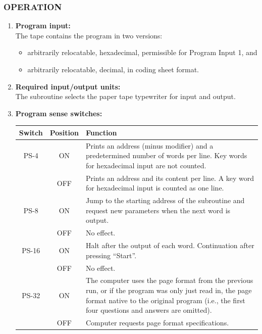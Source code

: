 \subsubsection*{OPERATION}
\begin{enumerate}
    \item \textbf{Program input:} \\
    The tape contains the program in two versions:
    \begin{itemize}
        \item[a)] arbitrarily relocatable, hexadecimal, permissible for Program Input 1, and
        \item[b)] arbitrarily relocatable, decimal, in coding sheet format.
    \end{itemize}
    \item \textbf{Required input/output units:} \\
    The subroutine selects the paper tape typewriter for input and output.
    \item \textbf{Program sense switches:}
    \begin{table}[h!]
    \centering
    \begin{tabularx}{\textwidth}{ccX}
    \toprule
    \textbf{Switch} & \textbf{Position} & \textbf{Function} \\
    \midrule
    \textsf{PS-4}  & \textsf{ON}  & Prints an address (minus modifier) and a predetermined number of words per line. Key words for hexadecimal input are not counted. \\
                   & \textsf{OFF} & Prints an address and its content per line. A key word for hexadecimal input is counted as one line. \\
    \midrule
    \textsf{PS-8}  & \textsf{ON}  & Jump to the starting address of the subroutine and request new parameters when the next word is output. \\
                   & \textsf{OFF} & No effect. \\
    \midrule
    \textsf{PS-16} & \textsf{ON}  & Halt after the output of each word. Continuation after pressing ``Start''. \\
                   & \textsf{OFF} & No effect. \\
    \midrule
    \textsf{PS-32} & \textsf{ON}  & The computer uses the page format from the previous run, or if the program was only just read in, the page format native to the original program (i.e., the first four questions and answers are omitted). \\
                   & \textsf{OFF} & Computer requests page format specifications. \\
    \bottomrule
    \end{tabularx}
    \end{table}
\end{enumerate}

